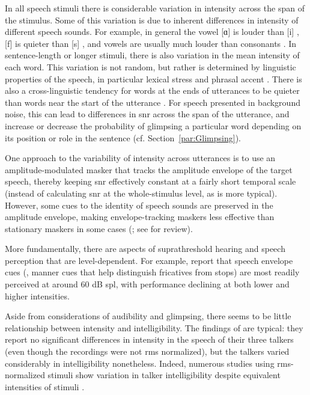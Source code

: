 In all speech stimuli there is considerable variation in intensity across the span of the stimulus.  Some of this variation is due to inherent differences in intensity of different speech sounds.  For example, in general the vowel [ɑ] is louder than [i] \citep{Ladefoged1967}, [f] is quieter than [s] \citep{sowl}, and vowels are usually much louder than consonants \citep{HoriiEtAl1971}.  In sentence-length or longer stimuli, there is also variation in the mean intensity of each word.  This variation is not random, but rather is determined by linguistic properties of the speech, in particular lexical stress and phrasal accent \citep{Fry1955, SluijterVanHeuven1996, PlagEtAl2011}.  There is also a cross-linguistic tendency for words at the ends of utterances to be quieter than words near the start of the utterance \citep{StrikBoves1995, TrouvainEtAl1998}.  For speech presented in background noise, this can lead to differences in \ac{snr} across the span of the utterance, and increase or decrease the probability of glimpsing a particular word depending on its position or role in the sentence (cf. Section~\ref{par:Glimpsing}).  

One approach to the variability of intensity across utterances is to use an amplitude-modulated masker that tracks the amplitude envelope of the target speech, thereby keeping \ac{snr} effectively constant at a fairly short temporal scale (instead of calculating \ac{snr} at the whole-stimulus level, as is more typical).  However, some cues to the identity of speech sounds are preserved in the amplitude envelope, making envelope-tracking maskers less effective than stationary maskers in some cases (\citealp{HoriiEtAl1971, VanTasellEtAl1987, BashfordEtAl1996}; see \citealp{Wright2004b} for review).

More fundamentally, there are aspects of suprathreshold hearing and speech perception that are level-dependent.  For example, \citet{DubnoEtAl2012} report that speech envelope cues (\eg, manner cues that help distinguish fricatives from stops) are most readily perceived at around 60 dB \ac{spl}, with performance declining at both lower and higher intensities. %

Aside from considerations of audibility and glimpsing, there seems to be little relationship between intensity and intelligibility.  The findings of \citet{BondMoore1994} are typical: they report no significant differences in intensity in the speech of their three talkers (even though the recordings were not \ac{rms} normalized), but the talkers varied considerably in intelligibility nonetheless.  Indeed, numerous studies using \ac{rms}-normalized stimuli show variation in talker intelligibility despite equivalent intensities of stimuli \citep[is one example]{McCloyEtAl2013}. %

